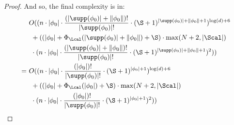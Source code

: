 \begin{proof}
And so, the final complexity is in:
\begin{align*}
	&O((n \cdot|\phi_0|\cdot \frac{(|\supp(\phi_0)| + \|\phi_0\|)!}{|\supp(\phi_0)|!}\cdot (\S + 1)^{|\supp(\phi_0)| + \|\phi_0\| + 1})^{\log(d) + 6}
	\\ &\ + (
	(|\phi_0| + \Phi_\Lcal(|\supp(\phi_0)| + \|\phi_0\|) + \S)
	\cdot
	\max(N + 2, |\Scal|
	) \\&\ \cdot 
	(n \cdot|\phi_0|\cdot \frac{(|\supp(\phi_0)|+\|\phi_0\|)!}{|\supp(\phi_0)|!}\cdot (\S + 1)^{|\supp(\phi_0)| + \|\phi_0\| + 1})
	^2)
	)
	\\
	=\ &O((n \cdot|\phi_0|\cdot \frac{(|\phi_0|)!}{|\supp(\phi_0)|!}\cdot (\S + 1)^{|\phi_0| + 1})^{\log(d) + 6}
	\\ &\ + (
	(|\phi_0| + \Phi_\Lcal(|\phi_0|) + \S)
	\cdot
	\max(N + 2, |\Scal|
	) \\&\ \cdot 
	(n \cdot|\phi_0|\cdot \frac{(|\phi_0|)!}{|\supp(\phi_0)|!}\cdot (\S + 1)^{|\phi_0| + 1})
	^2)
	)
\end{align*}
\end{proof}

 





